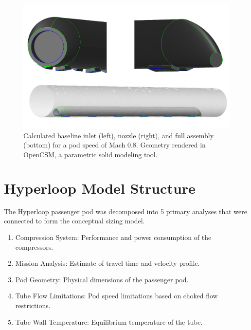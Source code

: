 \documentclass[heading.tex]{subfiles}
\begin{document}
\begin{figure}[hbtp]
\centering
\includegraphics[width=\textwidth]{images/hyperloop_cad.png}
 \caption[Hyperloop geometry assembled in OpenCSM]{Calculated baseline inlet (left), nozzle (right), and full assembly (bottom) for a pod speed of Mach 0.8. Geometry rendered in OpenCSM, a parametric solid modeling tool.}
\label{f:hyperloopCAD}
\end{figure}


\section{Hyperloop Model Structure}


The Hyperloop passenger pod was decomposed into 5 primary analyses that were connected to 
form the conceptual sizing model. 

\begin{enumerate}
  \item Compression System: Performance and power consumption of the compressors.
  \item Mission Analysis: Estimate of travel time and velocity profile.
  \item Pod Geometry: Physical dimensions of the passenger pod.
  \item Tube Flow Limitations: Pod speed limitations based on choked flow restrictions.
  \item Tube Wall Temperature: Equilibrium temperature of the tube.
\end{enumerate}
\end{document}
